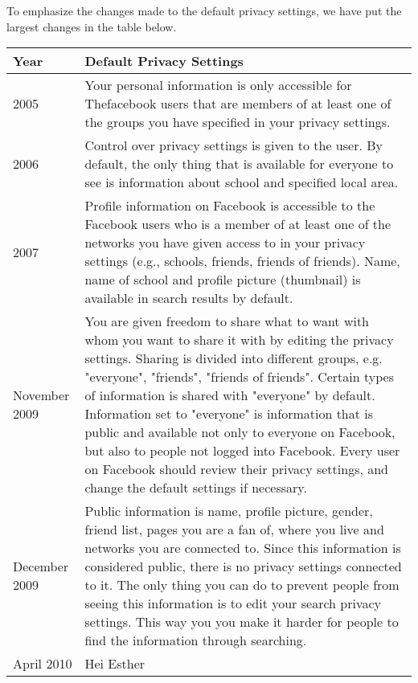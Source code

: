 To emphasize the changes made to the default privacy settings, we have put the largest changes in the table below. 
\begin{center}
    \begin{tabular}{ | l | p{9cm} |}
    \hline
    \textbf{Year} & \textbf{Default Privacy Settings} \\ 
    \hline
    2005 & Your personal information is only accessible for 			Thefacebook users that are members of at least one of the 			groups you have specified in your privacy settings.\\ 
    \hline
    2006 & Control over privacy settings is given to the user. By 		default, the only thing that is available for everyone to see 		is information about school and specified local area. \\ 
    \hline
    2007 & Profile information on Facebook is accessible to the 		Facebook users who is a member of at least one of the networks 		you have given access to in your privacy settings (e.g., 			schools, friends, friends of friends). Name, name of school and 	profile picture (thumbnail) is available in search results by 		default.\\
    \hline
    November 2009 & You are given freedom to share what to want 		with whom you want to share it with by editing the privacy 			settings. Sharing is divided into different groups, e.g. 			"everyone", "friends", "friends of friends". Certain types of		information is shared with "everyone" by default. Information 		set to "everyone" is information that is public and available 		not only to everyone on Facebook, but also to people not logged 	into Facebook. Every user on Facebook should review their 			privacy settings, and change the default settings if necessary.
	\\
	\hline
    December 2009 & Public information is name, profile picture, 		gender, friend list, pages you are a fan of, where you live and 	networks you are connected to. Since this information is 			considered public, there is no privacy settings connected to 		it. The only thing you can do to prevent people from seeing 		this information is to edit your search privacy settings. This 		way you you make it harder for people to find the 					information through searching. \\
    \hline
    April 2010 & Hei Esther \\
    \hline
    \end{tabular}
\end{center}



\markboth{}{}